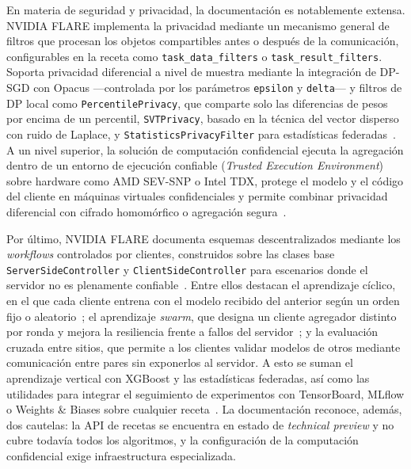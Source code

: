 En materia de seguridad y privacidad, la documentación es notablemente extensa.
NVIDIA FLARE implementa la privacidad mediante un mecanismo general de filtros que
procesan los objetos compartibles antes o después de la comunicación, configurables en
la receta como \texttt{task\_\allowbreak data\_\allowbreak filters} o \texttt{task\_\allowbreak result\_\allowbreak filters}. Soporta
privacidad diferencial a nivel de muestra mediante la integración de DP-SGD con Opacus
—controlada por los parámetros \texttt{epsilon} y \texttt{delta}— y filtros de DP local
como \texttt{PercentilePrivacy}, que comparte solo las diferencias de pesos por encima
de un percentil, \texttt{SVTPrivacy}, basado en la técnica del vector disperso con ruido
de Laplace, y \texttt{StatisticsPrivacyFilter} para estadísticas
federadas~\parencite{nvflareDP}. A un nivel superior, la solución de computación
confidencial ejecuta la agregación dentro de un entorno de ejecución confiable
(\textit{Trusted Execution Environment}) sobre hardware como AMD SEV-SNP o Intel TDX,
protege el modelo y el código del cliente en máquinas virtuales confidenciales y
permite combinar privacidad diferencial con cifrado homomórfico o agregación
segura~\parencite{nvflareSecurity,nvflareConfidential}.

Por último, NVIDIA FLARE documenta esquemas descentralizados mediante los
\textit{workflows} controlados por clientes, construidos sobre las clases base
\texttt{ServerSideController} y \texttt{ClientSideController} para escenarios donde el
servidor no es plenamente confiable~\parencite{nvflareSwarm}. Entre ellos destacan el
aprendizaje cíclico, en el que cada cliente entrena con el modelo recibido del anterior
según un orden fijo o aleatorio~\parencite{nvflareCyclic}; el aprendizaje \textit{swarm},
que designa un cliente agregador distinto por ronda y mejora la resiliencia frente a
fallos del servidor~\parencite{nvflareSwarm}; y la evaluación cruzada entre sitios, que
permite a los clientes validar modelos de otros mediante comunicación entre pares sin
exponerlos al servidor. A esto se suman el aprendizaje vertical con XGBoost y las
estadísticas federadas, así como las utilidades para integrar el seguimiento de
experimentos con TensorBoard, MLflow o Weights \& Biases sobre cualquier
receta~\parencite{nvflareTracking,nvflareRecipes}. La documentación reconoce, además,
dos cautelas: la API de recetas se encuentra en estado de \textit{technical preview} y
no cubre todavía todos los algoritmos, y la configuración de la computación confidencial
exige infraestructura especializada.

